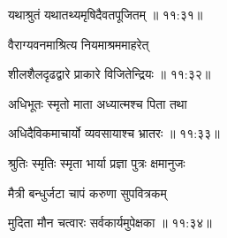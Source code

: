 
{\devanagarifont यथाश्रुतं यथातथ्यमृषिदैवतपूजितम् {॥ ११:३१॥} \veg\dontdisplaylinenum }%

{\devanagarifont वैराग्यवनमाश्रित्य नियमाश्रममाहरेत् \thinspace{\dandab} \dontdisplaylinenum }%


{\devanagarifont शीलशैलदृढद्वारे प्राकारे विजितेन्द्रियः {॥ ११:३२॥} \veg\dontdisplaylinenum }%

{\devanagarifont अधिभूतः स्मृतो माता अध्यात्मश्च पिता तथा \thinspace{\dandab} \dontdisplaylinenum }%


{\devanagarifont अधिदैविकमाचार्यो व्यवसायाश्च भ्रातरः {॥ ११:३३॥} \veg\dontdisplaylinenum }%

{\devanagarifont श्रुतिः स्मृतिः स्मृता भार्या प्रज्ञा पुत्रः क्षमानुजः \thinspace{\dandab} \dontdisplaylinenum }%

{\devanagarifont मैत्री बन्धुर्जटा चापं करुणा सुपवित्रकम्  \danda\dontdisplaylinenum }%


{\devanagarifont मुदिता मौन चत्वारः सर्वकार्यमुपेक्षका {॥ ११:३४॥} \veg\dontdisplaylinenum }%

